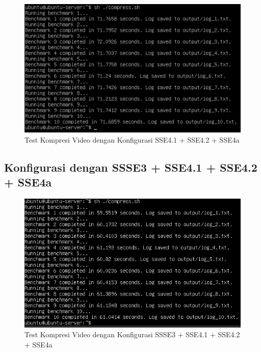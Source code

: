 \begin{figure}
    \centering
    \includegraphics[width=1\textwidth]
    {assets/pics/video-compression-test/sse4.1,sse4.2,sse4a.jpeg}
    \caption{Test Kompresi Video dengan Konfigurasi SSE4.1 + SSE4.2 + SSE4a}
    \label{fig:video_compression_test_sse4.1,sse4.2,sse4a.jpeg}
\end{figure}

\subsection{Konfigurasi dengan SSSE3 + SSE4.1 + SSE4.2 + SSE4a}

\begin{figure}
    \centering
    \includegraphics[width=1\textwidth]
    {assets/pics/video-compression-test/ssse3,sse4.1,sse4.2,sse4a.jpeg}
    \caption{Test Kompresi Video dengan Konfigurasi SSSE3 + SSE4.1 + SSE4.2 + SSE4a}
    \label{fig:video_compression_test_ssse3,sse4.1,sse4.2,sse4a.jpeg}
\end{figure}

